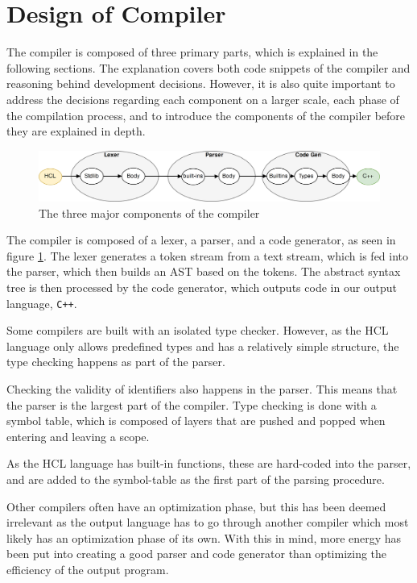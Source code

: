 \section{Design of Compiler}
The compiler is composed of three primary parts, which is explained in the following sections.
The explanation covers both code snippets of the compiler and reasoning behind development decisions.
However, it is also quite important to address the decisions regarding each component on a larger scale, each phase of the compilation process, and to introduce the components of the compiler before they are explained in depth.
\begin{figure}[H]
	\centering
	\includegraphics[width=\textwidth]{4.Solution/images/compiler_process.png}
	\caption{The three major components of the compiler}
	\label{fig:compilerProcess}
\end{figure}


The compiler is composed of a lexer, a parser, and a code generator, as seen in figure \ref{fig:compilerProcess}.
The lexer generates a token stream from a text stream, which is fed into the parser, which then builds an AST based on the tokens.
The abstract syntax tree is then processed by the code generator, which outputs code in our output language, \texttt{C++}.

Some compilers are built with an isolated type checker.
However, as the HCL language only allows predefined types and has a relatively simple structure, the type checking happens as part of the parser.

Checking the validity of identifiers also happens in the parser.
This means that the parser is the largest part of the compiler.
Type checking is done with a symbol table, which is composed of layers that are pushed and popped when entering and leaving a scope.
 
As the HCL language has built-in functions, these are hard-coded into the parser, and are added to the symbol-table as the first part of the parsing procedure.

Other compilers often have an optimization phase, but this has been deemed irrelevant as the output language has to go through another compiler which most likely has an optimization phase of its own. 
With this in mind, more energy has been put into creating a good parser and code generator than optimizing the efficiency of the output program.
